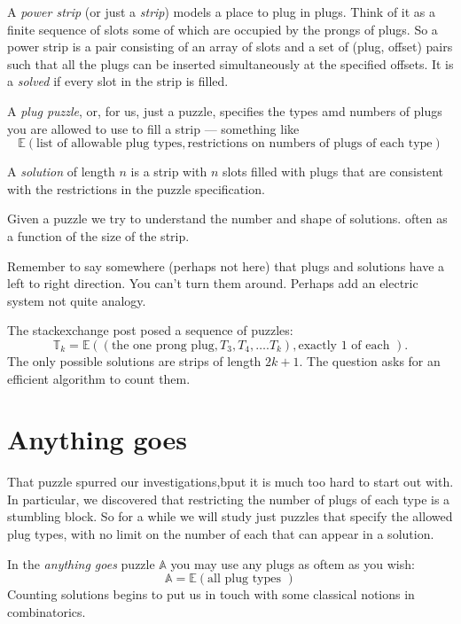 \documentclass[10pt]{article}
\numberwithin{equation}{section}
\newenvironment{anote}
               {{\textcolor{blue}{Note:}}
                 \itshape
               }
               {}
\newcommand{\puzzle}{%
   \ensuremath{
   \mathbb{E}
   }
}
\begin{document}
 A \emph{power strip} (or just a \emph{strip}) models a place to plug
 in plugs. Think of it as a finite sequence of slots some of
 which are occupied by the prongs of plugs. So a power strip
is a pair consisting of an array of slots and a set of (plug, offset)
pairs such that all the plugs can be inserted simultaneously at
 the specified offsets. It is a \emph{solved} if
 every slot in the strip is filled.

A \emph{plug puzzle}, or, for us, just a puzzle, specifies the types amd numbers of plugs you are allowed to use to fill a strip --- something like
\begin{equation*}
    \puzzle(\text{list of allowable plug types},\text{restrictions on numbers of plugs of each type})
\end{equation*}

A \emph{solution} of length $n$ is a strip with $n$ slots filled with plugs that are consistent with the restrictions in the puzzle specification.


Given a puzzle we try to understand the number and shape of solutions. often as
  a function of the size of the strip.

\begin{anote}
Remember to say somewhere (perhaps not here) that plugs and solutions have a left to right direction. You can't turn them around. Perhaps add an electric system not quite analogy.
\end{anote}

The stackexchange post posed a sequence of puzzles:
\begin{equation*}
\mathbb{T}_k = \puzzle( (\text{the one prong plug}, T_3, T_4, \ldots. T_k), \text{exactly 1 of each } ).
\end{equation*}
The only possible solutions are strips of length $2k+1$. The question asks for an efficient algorithm to count them.

 \section{Anything goes}
 
That puzzle spurred our investigations,bput it is much too hard to start out with. In particular, we discovered that restricting the number of plugs of each type is a stumbling block. So for a while we will study just puzzles that specify the allowed plug types, with no limit on the number of each that can appear in a solution.

In the \emph{anything goes}  puzzle $\mathbb{A}$  you may use any plugs as oftem as you wish:
\begin{equation*}
  \mathbb{A}  = \puzzle(\text{all plug types } )
\end{equation*}
Counting solutions begins to put us in touch with some classical notions
in combinatorics.
\end{document}
